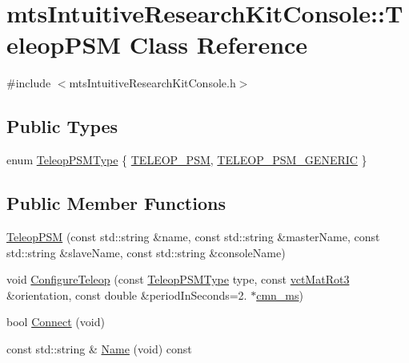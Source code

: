 \hypertarget{classmts_intuitive_research_kit_console_1_1_teleop_p_s_m}{\section{mts\-Intuitive\-Research\-Kit\-Console\-:\-:Teleop\-P\-S\-M Class Reference}
\label{classmts_intuitive_research_kit_console_1_1_teleop_p_s_m}
}


{\ttfamily \#include $<$mts\-Intuitive\-Research\-Kit\-Console.\-h$>$}

\subsection*{Public Types}
\begin{DoxyCompactItemize}
\item 
enum \hyperlink{classmts_intuitive_research_kit_console_1_1_teleop_p_s_m_a977dd6507042ababf692f478cdf513cc}{Teleop\-P\-S\-M\-Type} \{ \hyperlink{classmts_intuitive_research_kit_console_1_1_teleop_p_s_m_a977dd6507042ababf692f478cdf513cca4db74eeaedf5f936b898a87741bae016}{T\-E\-L\-E\-O\-P\-\_\-\-P\-S\-M}, 
\hyperlink{classmts_intuitive_research_kit_console_1_1_teleop_p_s_m_a977dd6507042ababf692f478cdf513cca277ec25824581aef1d9d102c35513a7b}{T\-E\-L\-E\-O\-P\-\_\-\-P\-S\-M\-\_\-\-G\-E\-N\-E\-R\-I\-C}
 \}
\end{DoxyCompactItemize}
\subsection*{Public Member Functions}
\begin{DoxyCompactItemize}
\item 
\hyperlink{classmts_intuitive_research_kit_console_1_1_teleop_p_s_m_a3747a6494fa9d43fb2a8ecf00009270f}{Teleop\-P\-S\-M} (const std\-::string \&name, const std\-::string \&master\-Name, const std\-::string \&slave\-Name, const std\-::string \&console\-Name)
\item 
void \hyperlink{classmts_intuitive_research_kit_console_1_1_teleop_p_s_m_ac859d3c819d72fd946bcf241231f302f}{Configure\-Teleop} (const \hyperlink{classmts_intuitive_research_kit_console_1_1_teleop_p_s_m_a977dd6507042ababf692f478cdf513cc}{Teleop\-P\-S\-M\-Type} type, const \hyperlink{vct_transformation_types_8h_a30fe23c1d38748a9b8f2fb9bb2471382}{vct\-Mat\-Rot3} \&orientation, const double \&period\-In\-Seconds=2. $\ast$\hyperlink{cmn_units_8h_aaf4d3f2fafb9b4a95606544b9d876b4a}{cmn\-\_\-ms})
\item 
bool \hyperlink{classmts_intuitive_research_kit_console_1_1_teleop_p_s_m_af142c1d502cfeafebdf3f1196ce9b14a}{Connect} (void)
\item 
const std\-::string \& \hyperlink{classmts_intuitive_research_kit_console_1_1_teleop_p_s_m_a02c9b59b095e72025b8c44736b81b4fd}{Name} (void) const 
\end{DoxyCompactItemize}
